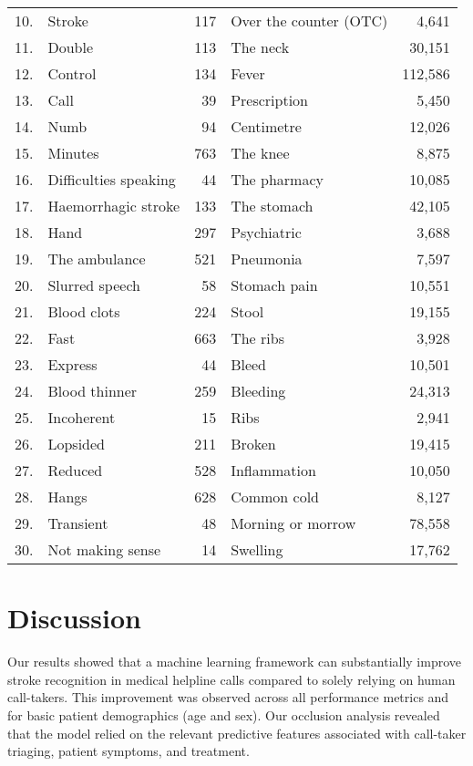{\begin{table}[t]
{\begin{tabular}{l|lr|lr}
        10. & Stroke & 117 & Over the counter (OTC) & 4,641 \\        
        11. & Double & 113 & The neck & 30,151 \\        
        12. & Control & 134 & Fever & 112,586 \\        
        13. & Call & 39 & Prescription & 5,450 \\        
        14. & Numb & 94 & Centimetre & 12,026 \\        
        15. & Minutes & 763 & The knee & 8,875 \\        
        16. & Difficulties speaking & 44 & The pharmacy & 10,085 \\        
        17. & Haemorrhagic stroke & 133 & The stomach & 42,105 \\        
        18. & Hand & 297 & Psychiatric & 3,688 \\        
        19. & The ambulance & 521 & Pneumonia & 7,597 \\        
        20. & Slurred speech & 58 & Stomach pain & 10,551 \\        
        21. & Blood clots & 224 & Stool & 19,155 \\        
        22. & Fast & 663 & The ribs & 3,928 \\        
        23. & Express & 44 & Bleed & 10,501 \\        
        24. & Blood thinner & 259 & Bleeding & 24,313 \\        
        25. & Incoherent & 15 & Ribs & 2,941 \\        
        26. & Lopsided & 211 & Broken & 19,415 \\        
        27. & Reduced & 528 & Inflammation & 10,050 \\        
        28. & Hangs & 628 & Common cold & 8,127 \\        
        29. & Transient & 48 & Morning or morrow & 78,558 \\        
        30. & Not making sense & 14 & Swelling & 17,762 \\        
        \bottomrule
    \end{tabular}%
    }
\end{table}


\section{Discussion}

Our results showed that a machine learning framework can substantially improve stroke recognition in medical helpline calls compared to solely relying on human call-takers. This improvement was observed across all performance metrics and for basic patient demographics (age and sex). Our occlusion analysis revealed that the model relied on the relevant predictive features associated with call-taker triaging, patient symptoms, and treatment.

}
